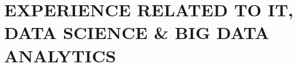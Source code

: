 \documentclass[10pt]{article}
\begin{document}
\begin{comment} \section{\bfseries{\scshape{Research projects}}} \hline \vspace{0.5cm}

\subsection{Academic}

\begin{enumerate} \item I was part of research on  academic environmental audit  held in Symbiosis by \textit{Common Wealth of Learning (COL)}, Canada, through Review Improvement Model (RIM). I acted as team lead \&  research associate  for module creativity and innovation. (please visit \url{http://www.col.org/news/Connections/2012Feb/Pages/News.aspx}

\item Acted as team leader for \textit{performance improvement research} (PIR) in \textit{Symbiosis} sponsored by SOES. \end{enumerate} \

\subsection{Corporate}

\begin{enumerate} \item Saint Gobain \item Reliance diary \item Reliance JIO Infocomm \item SHARP Electronics \end{enumerate} \end{comment} 



\section{EXPERIENCE RELATED TO IT, DATA SCIENCE \& BIG DATA ANALYTICS} \hline \vspace{0.5cm}
\end{document}
